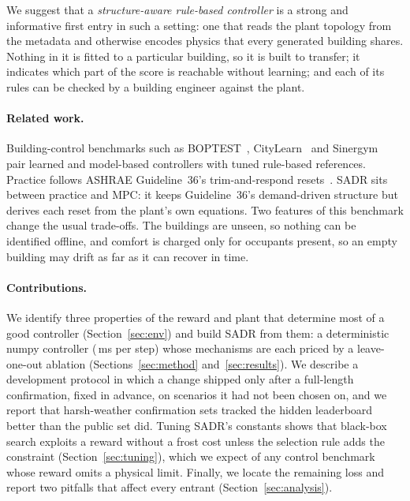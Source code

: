\documentclass{article}
\begin{document}
We suggest that a \emph{structure-aware rule-based controller} is a strong and informative first entry in such a setting: one that reads the plant topology from the metadata and otherwise encodes physics that every generated building shares. Nothing in it is fitted to a particular building, so it is built to transfer; it indicates which part of the score is reachable without learning; and each of its rules can be checked by a building engineer against the plant.

\paragraph{Related work.} Building-control benchmarks such as BOPTEST~\citep{blum2021boptest}, CityLearn~\citep{vazquezcanteli2019citylearn} and Sinergym~\citep{jimenezraboso2021sinergym} pair learned and model-based controllers with tuned rule-based references. Practice follows ASHRAE Guideline~36's trim-and-respond resets~\citep{ashrae2021g36,taylor2018vav}. SADR sits between practice and MPC: it keeps Guideline~36's demand-driven structure but derives each reset from the plant's own equations. Two features of this benchmark change the usual trade-offs. The buildings are unseen, so nothing can be identified offline, and comfort is charged only for occupants present, so an empty building may drift as far as it can recover in time.

\paragraph{Contributions.} We identify three properties of the reward and plant that determine most of a good controller (Section~\ref{sec:env}) and build SADR from them: a deterministic numpy controller (\PolicyMsOurs{}\,ms per step) whose mechanisms are each priced by a leave-one-out ablation (Sections~\ref{sec:method} and~\ref{sec:results}). We describe a development protocol in which a change shipped only after a full-length confirmation, fixed in advance, on scenarios it had not been chosen on, and we report that harsh-weather confirmation sets tracked the hidden leaderboard better than the public set did. Tuning SADR's constants shows that black-box search exploits a reward without a frost cost unless the selection rule adds the constraint (Section~\ref{sec:tuning}), which we expect of any control benchmark whose reward omits a physical limit. Finally, we locate the remaining loss and report two pitfalls that affect every entrant (Section~\ref{sec:analysis}).
\end{document}
